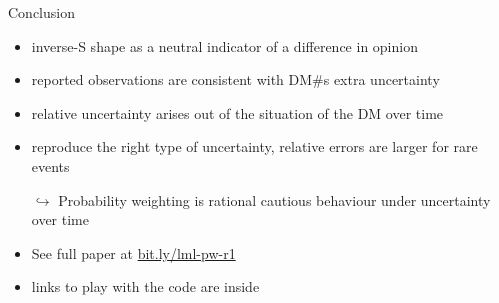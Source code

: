 \begin{frame}{Conclusion}
\begin{itemize}
  \item inverse-S shape as a neutral indicator of a difference in opinion
	\item reported observations are consistent with DM#s extra uncertainty
	\item relative uncertainty arises out of the situation of the DM over time
	\item reproduce the right type of uncertainty, \ie relative errors are larger for rare events
  \item[$\hookrightarrow$] Probability weighting is rational cautious behaviour under uncertainty over time
  \item[]
  \item See full paper at \url{bit.ly/lml-pw-r1}
  \item links to play with the code are inside
\end{itemize}

\end{frame}
